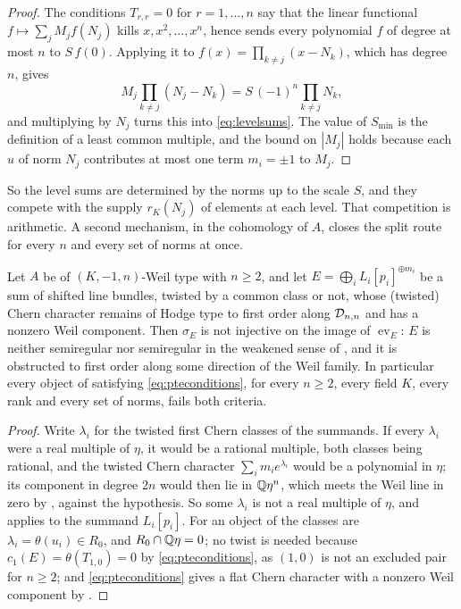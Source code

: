\begin{proof}
The conditions $T_{r,r}=0$ for $r=1,\dots,n$ say that the linear
functional $f\mapsto\sum_{j}M_{j}f(N_{j})$ kills $x,x^{2},\dots,x^{n}$, hence
sends every polynomial $f$ of degree at most $n$ to $S\,f(0)$. Applying it to
$f(x)=\prod_{k\ne j}(x-N_{k})$, which has degree $n$, gives
\[
  M_{j}\prod_{k\ne j}(N_{j}-N_{k})=S\,(-1)^{n}\prod_{k\ne j}N_{k},
\]
and multiplying by $N_{j}$ turns this into \eqref{eq:levelsums}. The value of
$S_{\min}$ is the definition of a least common multiple, and the bound on
$|M_{j}|$ holds because each $u$ of norm $N_{j}$ contributes at most one term
$m_{i}=\pm1$ to $M_{j}$.
\end{proof}

So the level sums are determined by the norms up to the scale $S$, and they
compete with the supply $r_{K}(N_{j})$ of elements at each level. That
competition is arithmetic. A second mechanism, in the cohomology of $A$,
closes the split route for every $n$ and every set of norms at once.

\begin{corollary}\label{cor:noline}
Let $A$ be of $(K,-1,n)$-Weil type with $n\ge2$, and let
$E=\bigoplus_{i}L_{i}[p_{i}]^{\oplus m_{i}}$ be a sum of shifted line bundles,
twisted by a common class or not, whose (twisted) Chern character remains of
Hodge type to first order along $\mathcal{D}_{n,n}$ and has a nonzero Weil component.
Then $\sigma_{E}$ is not injective on the image of $\operatorname{ev}_{E}$:
$E$ is neither semiregular nor semiregular in the weakened sense of
\cite[Question 11.4]{Mar25b}, and it is obstructed to first order along some
direction of the Weil family. In particular every object of 
satisfying \eqref{eq:pteconditions}, for every $n\ge2$, every field $K$,
every rank and every set of norms, fails both criteria.
\end{corollary}

\begin{proof}
Write $\lambda_{i}$ for the twisted first Chern classes of the summands. If
every $\lambda_{i}$ were a real multiple of $\eta$, it would be a rational
multiple, both classes being rational, and the twisted Chern character
$\sum_{i}m_{i}e^{\lambda_{i}}$ would be a polynomial in $\eta$; its component
in degree $2n$ would then lie in $\mathbb{Q}\eta^{n}$, which meets the Weil line in
zero by , against the hypothesis. So some $\lambda_{i}$ is
not a real multiple of $\eta$, and  applies to the
summand $L_{i}[p_{i}]$. For an object of  the classes are
$\lambda_{i}=\theta(u_{i})\in R_{0}$, and $R_{0}\cap\mathbb{Q}\eta=0$; no twist is
needed because $c_{1}(E)=\theta(T_{1,0})=0$ by \eqref{eq:pteconditions}, as
$(1,0)$ is not an excluded pair for $n\ge2$; and \eqref{eq:pteconditions}
gives a flat Chern character with a nonzero Weil component by
.
\end{proof}

